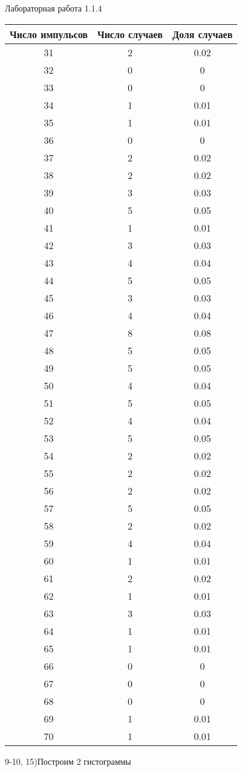 \documentclass{astroedu-lab}
\begin{document}
\begin{problem}{\large Лабораторная работа 1.1.4}
\begin{center}
\begin{tabular}[t]{|c|c|c|}
\hline
Число импульсов & Число случаев & Доля случаев \\
\hline
31 & 2 & 0.02\\
32 & 0 & 0\\
33 & 0 & 0\\
34 & 1 & 0.01\\
35 & 1 & 0.01\\
36 & 0 & 0\\
37 & 2 & 0.02\\
38 & 2 & 0.02\\
39 & 3 & 0.03\\
40 & 5 & 0.05\\
41 & 1 & 0.01\\
42 & 3 & 0.03\\
43 & 4 & 0.04\\
44 & 5 & 0.05\\
45 & 3 & 0.03\\
46 & 4 & 0.04\\
47 & 8 & 0.08\\
48 & 5 & 0.05\\
49 & 5 & 0.05\\
50 & 4 & 0.04\\
51 & 5 & 0.05\\
52 & 4 & 0.04\\
53 & 5 & 0.05\\
54 & 2 & 0.02\\
55 & 2 & 0.02\\
56 & 2 & 0.02\\
57 & 5 & 0.05\\
58 & 2 & 0.02\\
59 & 4 & 0.04\\
60 & 1 & 0.01\\
61 & 2 & 0.02\\
62 & 1 & 0.01\\
63 & 3 & 0.03\\
64 & 1 & 0.01\\
65 & 1 & 0.01\\
66 & 0 & 0\\
67 & 0 & 0\\
68 & 0 & 0\\
69 & 1 & 0.01\\
70 & 1 & 0.01\\
\hline
\end{tabular}
\end{center}

9-10, 15)Построим 2 гистограммы


\end{problem}
\end{document}
